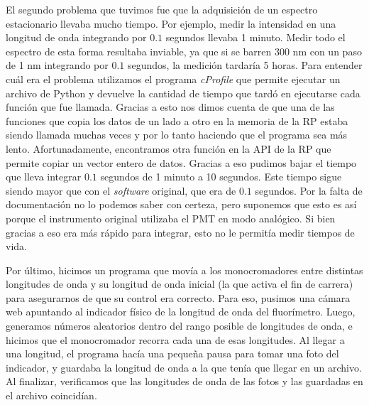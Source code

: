 El segundo problema que tuvimos fue que la adquisición de un espectro estacionario llevaba mucho tiempo. 
Por ejemplo, medir la intensidad en una longitud de onda integrando por $0.1$ segundos llevaba 1 minuto.
Medir todo el espectro de esta forma resultaba inviable, ya que si se barren 300 nm con un paso de 1 nm integrando por $0.1$ segundos, la medición tardaría 5 horas.
Para entender cuál era el problema utilizamos el programa \textit{cProfile} que permite ejecutar un archivo de Python y devuelve la cantidad de tiempo que tardó en ejecutarse cada función que fue llamada.
Gracias a esto nos dimos cuenta de que una de las funciones que copia los datos de un lado a otro en la memoria de la RP estaba siendo llamada muchas veces y por lo tanto haciendo que el programa sea más lento.
Afortunadamente, encontramos otra función en la API de la RP que permite copiar un vector entero de datos.
Gracias a eso pudimos bajar el tiempo que lleva integrar $0.1$ segundos de 1 minuto a 10 segundos.
Este tiempo sigue siendo mayor que con el \textit{software} original, que era de $0.1$ segundos.
Por la falta de documentación no lo podemos saber con certeza, pero suponemos que esto es así porque el instrumento original utilizaba el PMT en modo analógico.
Si bien gracias a eso era más rápido para integrar, esto no le permitía medir tiempos de vida.

Por último, hicimos un programa que movía a los monocromadores entre distintas longitudes de onda y su longitud de onda inicial (la que activa el fin de carrera) para asegurarnos de que su control era correcto. 
Para eso, pusimos una cámara web apuntando al indicador físico de la longitud de onda del fluorímetro.
Luego, generamos números aleatorios dentro del rango posible de longitudes de onda, e hicimos que el monocromador recorra cada una de esas longitudes.
Al llegar a una longitud, el programa hacía una pequeña pausa para tomar una foto del indicador, y guardaba la longitud de onda a la que tenía que llegar en un archivo.
Al finalizar, verificamos que las longitudes de onda de las fotos y las guardadas en el archivo coincidían.







